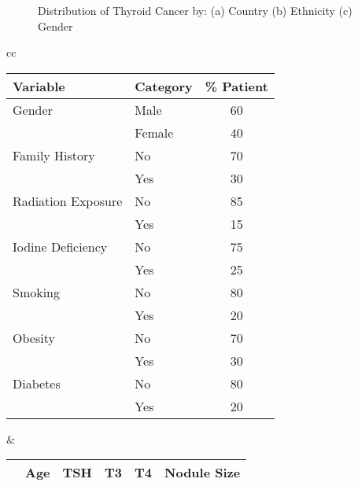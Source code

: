 \documentclass[11pt,a4paper]{article}
\begin{document}
\begin{figure}[H]
    \centering
    \caption{Distribution of Thyroid Cancer by: (a) Country (b) Ethnicity (c) Gender}
    \label{fig:fig1}
\end{figure}

\begin{table}[H]
\begin{tabular}{cc}
    \begin{minipage}{.45\linewidth}
       \begin{tabular}{|l|l|c|}\hline
Variable                              & Category  & \% Patient \\ \hline
Gender               & Male      & 60 \\ \cline{2-3}
                     & Female    & 40 \\ \hline
Family History       & No        & 70 \\ \cline{2-3}
                     & Yes       & 30  \\ \hline
Radiation Exposure   & No        & 85 \\ \cline{2-3}
                     & Yes       & 15  \\ \hline 
Iodine Deficiency    & No        & 75 \\ \cline{2-3}
                     & Yes       & 25  \\ \hline 
Smoking              & No        & 80 \\ \cline{2-3}
                     & Yes       & 20  \\ \hline  
Obesity              & No        & 70 \\ \cline{2-3}
                     & Yes       & 30  \\ \hline  
Diabetes             & No        & 80 \\ \cline{2-3}
                     & Yes       & 20  \\ \hline                                                                           
\end{tabular}
    \end{minipage} &
    \begin{minipage}{.45\linewidth}
       \begin{tabular}{|l|c|c|c|c|c|}
\hline
              & Age    & TSH    & T3     & T4     & Nodule Size \\ \hline

\end{tabular}
\end{minipage}
\end{tabular}
\end{table}
\end{document}
